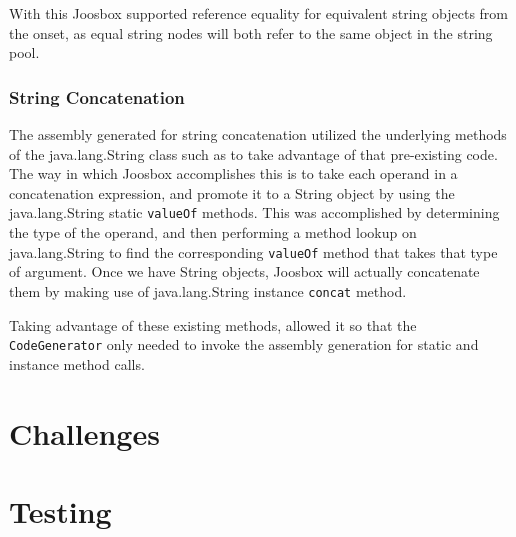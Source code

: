 \documentclass[letterpaper]{article}
\begin{document}
  With this Joosbox supported reference equality for equivalent string objects
  from the onset, as equal string nodes will both refer to the same object in
  the string pool.

  \subsubsection{String Concatenation}

  The assembly generated for string concatenation utilized the underlying
  methods of the java.lang.String class such as to take advantage of that
  pre-existing code. The way in which Joosbox accomplishes this is to take each
  operand in a concatenation expression, and promote it to a String object by
  using the java.lang.String static {\tt valueOf} methods. This was accomplished
  by determining the type of the operand, and then performing a method lookup on
  java.lang.String to find the corresponding {\tt valueOf} method that takes
  that type of argument. Once we have String objects, Joosbox will actually
  concatenate them by making use of java.lang.String instance {\tt concat}
  method.

  Taking advantage of these existing methods, allowed it so that the {\tt
  CodeGenerator} only needed to invoke the assembly generation for static and
  instance method calls.

  \section{Challenges}


  \section{Testing}
\end{document}
